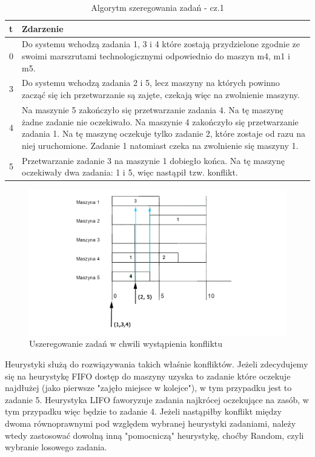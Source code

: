 \documentclass[twoside]{kInzynierka}
\begin{document}
\begin{table}[htb]
    \begin{tabular}{ p{0.75cm} | p{13cm} }
    t & Zdarzenie \\ \hline
    0 & Do systemu wchodzą zadania 1, 3 i 4 które zostają przydzielone zgodnie ze swoimi marszrutami technologicznymi odpowiednio do maszyn m4, m1 i m5.  \\ \hline
    3 & Do systemu wchodzą zadania 2 i 5, lecz maszyny na których powinno zacząć się ich przetwarzanie są zajęte, czekają więc na zwolnienie maszyny. \\ \hline
    4 & Na maszynie 5 zakończyło się przetwarzanie zadania 4. Na tę maszynę żadne zadanie nie oczekiwało. Na maszynie 4 zakończyło się przetwarzanie zadania 1. Na tę maszynę oczekuje tylko zadanie 2, które zostaje od razu na niej uruchomione. Zadanie 1 natomiast czeka na zwolnienie się maszyny 1. \\ \hline
    5 & Przetwarzanie zadanie 3 na maszynie 1 dobiegło końca. Na tę maszynę oczekiwały dwa zadania: 1 i 5, więc nastąpił tzw. konflikt.   
    \end{tabular}
    \caption{Algorytm szeregowania zadań - cz.1}
\end{table}

\begin{figure}[htb]
    \centering
    \includegraphics[width=\textwidth, keepaspectratio=true]{./obrazki/konf}
    \caption{Uszeregowanie zadań w chwili wystąpienia konfliktu}
\end{figure}

Heurystyki służą do rozwiązywania takich właśnie konfliktów. Jeżeli zdecydujemy się na heurystykę FIFO dostęp do maszyny uzyska to zadanie które oczekuje najdłużej (jako pierwsze "zajęło miejsce w kolejce"), w tym przypadku jest to zadanie 5. Heurystyka LIFO faworyzuje zadania najkrócej oczekujące na zasób, w tym przypadku więc będzie to zadanie 4. Jeżeli nastąpiłby konflikt między dwoma równoprawnymi pod względem wybranej heurystyki zadaniami, należy wtedy zastosować dowolną inną "pomocniczą" heurystykę, choćby Random, czyli wybranie losowego zadania.
\end{document}
